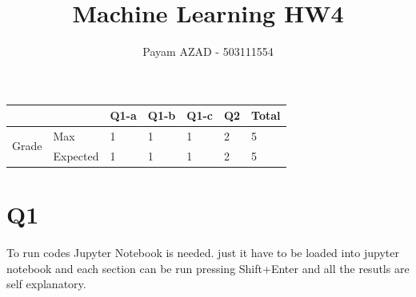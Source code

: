 \documentclass[11]{article}
\title{Machine Learning HW4}
\author{Payam AZAD - 503111554}
\begin{document}
 \maketitle
 
 \begin{table}[ht!]
\centering
\label{my-label}
\begin{tabular}{|ll|l|l|l|l|l|}
\hline
                                             &          & Q1-a & Q1-b & Q1-c & Q2 & Total \\ \hline
\multicolumn{1}{|l|}{\multirow{2}{*}{Grade}} & Max      & 1  & 1 & 1 & 2 &  5     \\ \cline{2-6} 
\multicolumn{1}{|l|}{}                       & Expected & 1  & 1 & 1 & 2 & 5   \\ \hline
\end{tabular}
\end{table}


\section*{Q1}
To run codes Jupyter Notebook is needed. just it have to be loaded into jupyter notebook and each section can be run pressing Shift+Enter and all the resutls are self explanatory.
\end{document}
